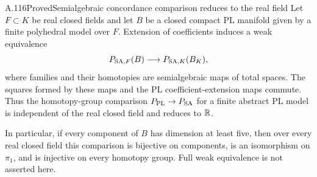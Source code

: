 \begin{saresult}{A.116}{Proved}{Semialgebraic concordance comparison reduces to the real field}
Let $F\subset K$ be real closed fields and let $B$ be a closed
compact PL manifold given by a finite polyhedral model over $F$.
Extension of coefficients induces a weak equivalence
\[
 P_{{\rm SA},F}(B)\longrightarrow P_{{\rm SA},K}(B_K),
\]
where families and their homotopies are semialgebraic maps of
total spaces. The squares formed by these maps and the PL
coefficient-extension maps commute. Thus the homotopy-group
comparison $P_{\rm PL}\to P_{\rm SA}$ for a finite abstract PL
model is independent of the real closed field and reduces to $\mathbb R$.

In particular, if every component of $B$ has dimension at least
five, then over every real closed field this comparison is
bijective on components, is an isomorphism on $\pi_1$, and is
injective on every homotopy group. Full weak equivalence is not
asserted here.
\end{saresult}
